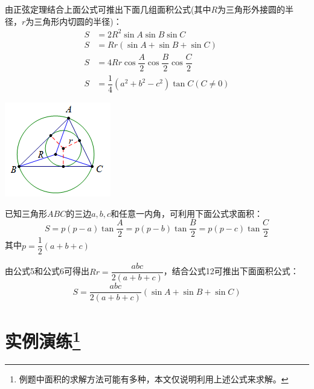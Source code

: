 \documentclass[10pt]{ctexart}
\begin{document}
\begin{minipage}[t]{0.7\textwidth}
\begin{dkli}{}{}
由正弦定理结合上面公式可推出下面几组面积公式(其中$R$为三角形外接圆的半径，$r$为三角形内切圆的半径)：
\begin{align*}
S&=2R^2 \sin A\sin B\sin C\\
S&=Rr(\sin A+\sin B+\sin C)\\
S&=4Rr \cos{\dfrac{A}{2}}\cos{\dfrac{B}{2}}\cos{\dfrac{C}{2}}\\
S&=\dfrac{1}{4}(a^2+b^2-c^2)\tan C(C\neq 0)
\end{align*}
\end{dkli}
\end{minipage}
\begin{minipage}[t]{0.3\textwidth}
\includegraphics[scale=1]{figure/mj-17.png}
\end{minipage}


\begin{minipage}[t]{0.7\textwidth}
\begin{dkli}{}{}
已知三角形$ABC$的三边$a,b,c$和任意一内角，可利用下面公式求面积：
\[S=p(p-a)\tan{\dfrac{A}{2}}=p(p-b)\tan{\dfrac{B}{2}}=p(p-c)\tan{\dfrac{C}{2}}\]
其中$p=\dfrac{1}{2}(a+b+c)$
\end{dkli}
\end{minipage}
\begin{minipage}[t]{0.3\textwidth}

\end{minipage}

\begin{minipage}[t]{0.7\textwidth}
\begin{dkli}{}{}
由公式5和公式6可得出$Rr=\dfrac{abc}{2(a+b+c)}$，结合公式12可推出下面面积公式：
\[S=\dfrac{abc}{2(a+b+c)}(\sin{A}+\sin{B}+\sin{C})\]
\end{dkli}
\end{minipage}
\begin{minipage}[t]{0.3\textwidth}

\end{minipage}

\section[实例演练]{实例演练\footnote{例题中面积的求解方法可能有多种，本文仅说明利用上述公式来求解。}}
\end{document}
